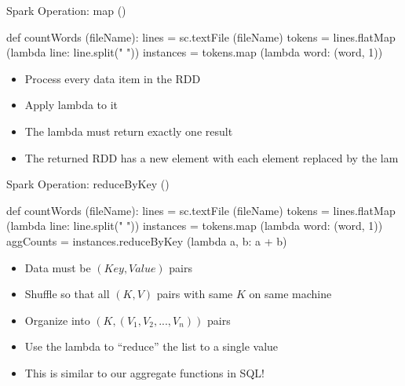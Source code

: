 \documentclass[aspectratio=169]{beamer}
\begin{document}
\begin{frame}[fragile]{Spark Operation: map ()}

\begin{SQL}
def countWords (fileName):
     lines = sc.textFile (fileName)
     tokens = lines.flatMap (lambda line: line.split(" "))
     instances = tokens.map (lambda word: (word, 1))
\end{SQL}

\begin{itemize}
\item Process every data item in the RDD
\item Apply lambda to it
\item The lambda must return exactly one result
\item The returned RDD has a new element with each element replaced by the lam
\end{itemize}
\end{frame}
\begin{frame}[fragile]{Spark Operation: reduceByKey ()}

\begin{SQL}
def countWords (fileName):
     lines = sc.textFile (fileName)
     tokens = lines.flatMap (lambda line: line.split(" "))
     instances = tokens.map (lambda word: (word, 1))
     aggCounts = instances.reduceByKey (lambda a, b: a + b)
\end{SQL}

\begin{itemize}
\item Data must be $(Key, Value)$ pairs
\item Shuffle so that all $(K, V)$ pairs with same $K$ on same machine
\item Organize into $(K, (V_1, V_2, ..., V_n))$ pairs
\item Use the lambda to ``reduce'' the list to a single value
\item This is similar to our aggregate functions in SQL!
\end{itemize}
\end{frame}
\end{document}
